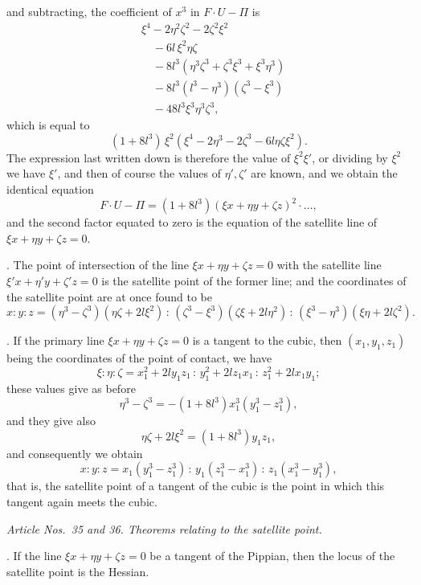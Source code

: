 \documentclass[11pt]{article}
\begin{document}
and subtracting, the coefficient of $x^3$ in $F \cdot U - \Pi$ is
\begin{align*}
&\xi^4 - 2\eta^2 \zeta^2 - 2\zeta^2 \xi^2 \\
&\quad - 6 l\,\xi^2 \eta\zeta \\
&\quad - 8 l^3 (\eta^3 \zeta^3 + \zeta^3 \xi^3 + \xi^3 \eta^3) \\
&\quad - 8 l^3 (l^3 - \eta^3)(\zeta^3 - \xi^3) \\
&\quad - 4 8 l^3 \xi^3 \eta^3 \zeta^3,
\end{align*}
which is equal to
\[
(1 + 8 l^3)\,\xi^2 (\xi^4 - 2\eta^3 - 2\zeta^3 - 6 l\eta\zeta\xi^2).
\]
The expression last written down is therefore the value of $\xi^2 \xi'$, or dividing by $\xi^2$ we have $\xi'$, and then of course the values of $\eta', \zeta'$ are known, and we obtain the identical equation
\[
F \cdot U - \Pi = (1 + 8 l^3)(\xi x + \eta y + \zeta z)^2 \cdot \ldots,
\]
and the second factor equated to zero is the equation of the satellite line of $\xi x + \eta y + \zeta z = 0$.

\medskip

. The point of intersection of the line $\xi x + \eta y + \zeta z = 0$ with the satellite line $\xi' x + \eta' y + \zeta' z = 0$ is the satellite point of the former line; and the coordinates of the satellite point are at once found to be
\[
x : y : z = (\eta^3 - \zeta^3)(\eta\zeta + 2 l \xi^2) \,:\, (\zeta^3 - \xi^3)(\zeta\xi + 2 l \eta^2) \,:\, (\xi^3 - \eta^3)(\xi\eta + 2 l \zeta^2).
\]

\medskip

. If the primary line $\xi x + \eta y + \zeta z = 0$ is a tangent to the cubic, then $(x_1, y_1, z_1)$ being the coordinates of the point of contact, we have
\[
\xi : \eta : \zeta = x_1^2 + 2 l y_1 z_1 \,:\, y_1^2 + 2 l z_1 x_1 \,:\, z_1^2 + 2 l x_1 y_1;
\]
these values give as before
\[
\eta^3 - \zeta^3 = -(1 + 8 l^3) x_1^3 (y_1^3 - z_1^3),
\]
and they give also
\[
\eta\zeta + 2 l \xi^2 = (1 + 8 l^3) y_1 z_1,
\]
and consequently we obtain
\[
x : y : z = x_1 (y_1^3 - z_1^3) \,:\, y_1 (z_1^3 - x_1^3) \,:\, z_1 (x_1^3 - y_1^3),
\]
that is, the satellite point of a tangent of the cubic is the point in which this tangent again meets the cubic.

\medskip

\textit{Article Nos.~35 and 36. Theorems relating to the satellite point.}

\medskip

. If the line $\xi x + \eta y + \zeta z = 0$ be a tangent of the Pippian, then the locus of the satellite point is the Hessian.
\end{document}
